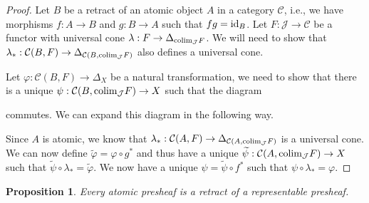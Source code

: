 \documentclass[12pt,oneside,reqno,a4paper]{article}
\newtheorem{proposition}[theorem]{Proposition}
\theoremstyle{definition}
\renewcommand{\tilde}[1]{\widetilde{#1}}
\renewcommand{\phi}{\varphi}
\newcommand{\id}{\textup{id}}
\newcommand{\C}{\mathcal{C}}
\newcommand{\J}{\mathcal{J}}
\newcommand{\colim}{\textup{colim}}
\begin{document}
\begin{proof}
Let $B$ be a retract of an atomic object $A$ in a category $\C$, i.e., we have morphisms $f:A\to B$ and $g:B\to A$ such that $fg=\id_B$. Let $F:\J\to \C$ be a functor with universal cone $\lambda:F\to\Delta_{\colim_{\J} F}$. We will need to show that $\lambda_*:\C(B,F)\to\Delta_{\C(B,\colim_{\J} F)}$ also defines a universal cone.

Let $\phi:\C(B,F)\to \Delta_X$ be a natural transformation, we need to show that there is a unique $\psi:\C(B,\colim_{\J} F)\to X$ such that the diagram 
\begin{center}
\end{center}
commutes. We can expand this diagram in the following way.
\begin{center}
\end{center}
Since $A$ is atomic, we know that $\lambda_*:\C(A,F)\to\Delta_{\C(A,\colim_{\J} F)}$ is a universal cone. We can now define $\tilde{\phi}=\phi \circ g^*$ and thus have a unique $\tilde{\psi}: \C(A,\colim_{\J} F)\to X$ such that $\tilde{\psi}\circ \lambda_*=\tilde{\phi}$. We now have a unique $\psi=\tilde{\psi}\circ f^*$ such that $\psi\circ\lambda_*=\phi$.
\end{proof}

\begin{proposition} \label{ato1ret}
Every atomic presheaf is a retract of a representable presheaf. 
\end{proposition}
\end{document}
